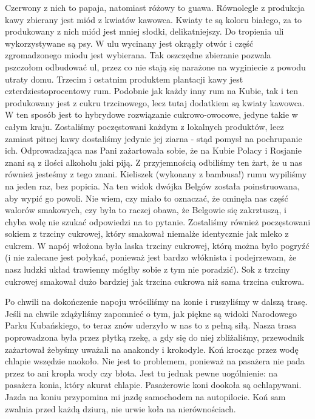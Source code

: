 Czerwony z nich to papaja, natomiast różowy to guawa.
Równolegle z produkcja kawy zbierany jest miód z kwiatów kawowca.
Kwiaty te są koloru białego, za to produkowany z nich miód jest mniej słodki, delikatniejszy.
Do tropienia uli wykorzystywane są psy.
W ulu wycinany jest okrągły otwór i część zgromadzonego miodu jest wybierana.
Tak oszczędne zbieranie pozwala pszczołom odbudować ul, przez co nie stają się narażone na wyginiecie z powodu utraty domu.
Trzecim i ostatnim produktem plantacji kawy jest czterdziestoprocentowy rum.
Podobnie jak każdy inny rum na Kubie, tak i ten produkowany jest z cukru trzcinowego, lecz tutaj dodatkiem są kwiaty kawowca.
W ten sposób jest to hybrydowe rozwiązanie cukrowo-owocowe, jedyne takie w całym kraju.
Zostaliśmy poczęstowani każdym z lokalnych produktów, lecz zamiast pitnej kawy dostaliśmy jedynie jej ziarna - stąd pomysł na pochrupanie ich.
Odprowadzająca nas Pani zażartowała sobie, że na Kubie Polacy i Rosjanie znani są z ilości alkoholu jaki piją.
Z przyjemnością odbiliśmy ten żart, że u nas również jesteśmy z tego znani.
Kieliszek (wykonany z bambusa!) rumu wypiliśmy na jeden raz, bez popicia.
Na ten widok dwójka Belgów została poinstruowana, aby wypić go powoli.
Nie wiem, czy miało to oznaczać, że ominęła nas część walorów smakowych, czy była to raczej obawa, że Belgowie się zakrztuszą, i chyba wolę nie szukać odpowiedzi na to pytanie.
Zostaliśmy również poczęstowani sokiem z trzciny cukrowej, który smakował niemalże identycznie jak mleko z cukrem.
W napój włożona była laska trzciny cukrowej, którą można było pogryźć (i nie zalecane jest połykać, ponieważ jest bardzo włóknista i podejrzewam, że nasz ludzki układ trawienny mógłby sobie z tym nie poradzić).
Sok z trzciny cukrowej smakował dużo bardziej jak trzcina cukrowa niż sama trzcina cukrowa.
\par Po chwili na dokończenie napoju wróciliśmy na konie i ruszyliśmy w dalszą trasę.
Jeśli na chwile zdążyliśmy zapomnieć o tym, jak piękne są widoki Narodowego Parku Kubańskiego, to teraz znów uderzyło w nas to z pełną siłą.
Nasza trasa poprowadzona była przez płytką rzekę, a gdy się do niej zbliżaliśmy, przewodnik zażartował żebyśmy uważali na anakondy i krokodyle.
Koń krocząc przez wodę chlapie wszędzie naokoło.
Nie jest to problemem, ponieważ na pasażera nie pada przez to ani kropla wody czy błota.
Jest tu jednak pewne uogólnienie: na pasażera konia, który akurat chlapie.
Pasażerowie koni dookoła są ochlapywani.
Jazda na koniu przypomina mi jazdę samochodem na autopilocie.
Koń sam zwalnia przed każdą dziurą, nie urwie koła na nierównościach.
